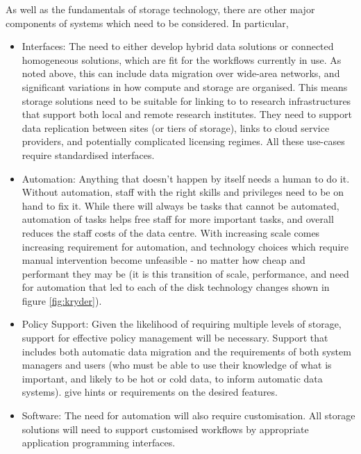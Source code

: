 As well as the fundamentals of storage technology, there are other major components of systems which need to be considered. In particular,
\begin{itemize}
\item Interfaces:  The need to either develop hybrid data solutions or connected homogeneous solutions, which are fit for the workflows currently in use.  As noted 
above, this can include data migration over wide-area networks, and significant variations in how compute and storage are organised. This means storage solutions 
need to be suitable for linking to to research infrastructures that support both local and remote research institutes. They need to support data replication between 
sites (or tiers of storage), links to cloud service providers, and potentially complicated licensing regimes.  All these use-cases require standardised interfaces.
\item Automation:  Anything that doesn't happen by itself needs a human to do it.  Without automation, staff
  with the right skills and privileges need to be on hand to fix it.  While there will always be tasks that cannot be
  automated, automation of tasks helps free staff for more important tasks, and overall reduces the staff costs of the
  data centre. With increasing scale comes increasing requirement for automation, and technology choices which require
  manual intervention become unfeasible - no matter how cheap and performant they may be (it is this transition of scale, performance, and need for automation that 
led to each of the disk technology changes  shown in figure \ref{fig:kryder}).
\item Policy Support: Given the likelihood of requiring multiple levels of storage, support for effective policy management will be necessary. Support that includes 
both automatic data migration and the requirements of both system managers and users (who must be able to use their knowledge of what is important, and likely to 
be hot or cold data, to inform automatic data systems). 
  give hints or requirements on the desired features. 
\item Software:  The need for automation will also require customisation.  All storage solutions will need to support customised workflows by appropriate application 
programming interfaces. 
\end{itemize}
